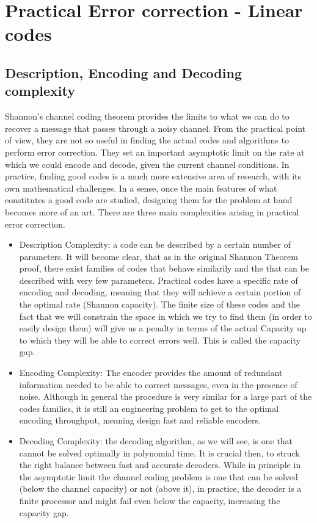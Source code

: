 \chapter{Practical Error correction - Linear codes}
\section{Description, Encoding and Decoding complexity}
Shannon's channel coding theorem provides the limits to what we can do to recover a message that passes through a noisy channel. From the practical point of view, they are not so useful in finding the actual codes and algorithms to perform error correction. They set an important  asymptotic limit on the rate at which we could encode and decode, given the current channel conditions. In practice, finding good codes is a much more extensive area of research, with its own mathematical challenges. In a sense, once the main features of what constitutes a good code are studied, designing them for the problem at hand becomes more of an art. There are three main complexities arising in practical error correction.
\begin{itemize}
	\item Description Complexity: a code can be described by a certain number of parameters. It will become clear, that as in the original Shannon Theorem proof, there exist families of codes that behave similarily and the that can be described with very few parameters. Practical codes have a specific rate of encoding and decoding, meaning that they will achieve a certain portion of the optimal rate (Shannon capacity). The finite size of these codes and the fact that we will constrain the space in which we try to find them (in order to easily design them) will give us a penalty in terms of the actual Capacity up to which they will be able to correct errors well. This is called the capacity gap.
	\item Encoding Complexity: The encoder provides the amount of redundant information needed to be able to correct messages, even in the presence of noise. Although in general the procedure is very similar for a large part of the codes families, it is still an engineering problem to get to the optimal encoding throughput, meaning design fast and reliable encoders.
	\item Decoding Complexity: the decoding algorithm, as we will see, is one that cannot be solved optimally in polynomial time. It is crucial then, to struck the right balance between fast and accurate decoders. While in principle in the asymptotic limit the channel coding problem is one that can be solved (below the channel capacity) or not (above it), in practice, the decoder is a finite processor and might fail even below the capacity, increasing the capacity gap.
\end{itemize}

